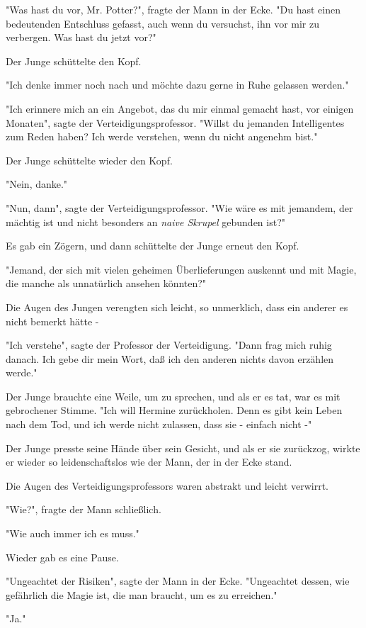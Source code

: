 {"Was hast du vor, Mr. Potter?", fragte der Mann in der Ecke. "Du hast einen bedeutenden Entschluss gefasst, auch wenn du versuchst, ihn vor mir zu verbergen. Was hast du jetzt vor?"

Der Junge schüttelte den Kopf.

"Ich denke immer noch nach und möchte dazu gerne in Ruhe gelassen werden."

"Ich erinnere mich an ein Angebot, das du mir einmal gemacht hast, vor einigen Monaten", sagte der Verteidigungsprofessor. "Willst du jemanden Intelligentes zum Reden haben? Ich werde verstehen, wenn du nicht angenehm bist."

Der Junge schüttelte wieder den Kopf.

"Nein, danke."

"Nun, dann", sagte der Verteidigungsprofessor. "Wie wäre es mit jemandem, der mächtig ist und nicht besonders an \emph{naive Skrupel} gebunden ist?"

Es gab ein Zögern, und dann schüttelte der Junge erneut den Kopf.

"Jemand, der sich mit vielen geheimen Überlieferungen auskennt und mit Magie, die manche als unnatürlich ansehen könnten?"

Die Augen des Jungen verengten sich leicht, so unmerklich, dass ein anderer es nicht bemerkt hätte -

"Ich verstehe", sagte der Professor der Verteidigung. "Dann frag mich ruhig danach. Ich gebe dir mein Wort, daß ich den anderen nichts davon erzählen werde."

Der Junge brauchte eine Weile, um zu sprechen, und als er es tat, war es mit gebrochener Stimme. "Ich will Hermine zurückholen. Denn es gibt kein Leben nach dem Tod, und ich werde nicht zulassen, dass sie - einfach nicht -"

Der Junge presste seine Hände über sein Gesicht, und als er sie zurückzog, wirkte er wieder so leidenschaftslos wie der Mann, der in der Ecke stand.

Die Augen des Verteidigungsprofessors waren abstrakt und leicht verwirrt.

"Wie?", fragte der Mann schließlich.

"Wie auch immer ich es muss."

Wieder gab es eine Pause.

"Ungeachtet der Risiken", sagte der Mann in der Ecke. "Ungeachtet dessen, wie gefährlich die Magie ist, die man braucht, um es zu erreichen."

"Ja."

}
